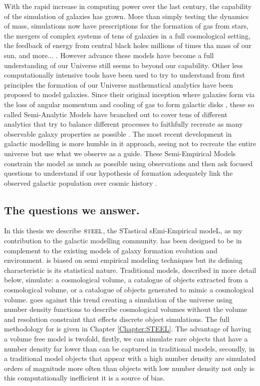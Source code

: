 With the rapid increase in computing power over the last century, the capability of the simulation of galaxies has grown. More than simply testing the dynamics of mass, simulations now have prescriptions for the formation of gas from stars, the mergers of complex systems of tens of galaxies in a full cosmological setting, the feedback of energy from central black holes millions of times tha mass of our sun, and more... \citep[e.g.,][]{McAlpine2015TheCatalogues, Pillepich2018FirstGalaxies}. However advance these models have become a full understanding of our Universe still seems to beyond our capability. Other less computationally intensive tools have been used to try to understand from first principles the formation of our Universe mathematical analytics have been proposed to model galaxies. Since their original inception where galaxies form via the loss of angular momentum and cooling of gas to form galactic disks \cite{Mo1998TheDiscs}, these so called Semi-Analytic Models have branched out to cover tens of different analytics that try to balance different processes to faithfully recreate as many observable galaxy properties as possible \citep[e.g.,][]{DeLucia2006TheGalaxies, Guo2011FromCosmology}. The most recent development in galactic modelling is more humble in it approach, seeing not to recreate the entire universe but use what we observe as a guide. These Semi-Empirical Models constrain the model as much as possible using observations and then ask focused questions to understand if our hypothesis of formation adequately link the observed galactic population over cosmic history \citep{Hopkins2010MERGERSMATTER, Zavala2012, Moster2013, Shankar2014, Moster2018Emerge10}.

\subsection{The questions we answer.}
In this thesis we describe $\textsc{steel}$, the STastical sEmi-Empirical modeL, as my contribution to the galactic modelling community. \steel has been designed to be in complement to the existing models of galaxy formation evolution and environment. \steel is biased on semi empirical modeling techniques but its defining characteristic is its statistical nature. Traditional models, described in more detail below, simulate: a cosmological volume, a catalogue of objects extracted from a cosmological volume, or a catalogue of objects generated to mimic a cosmological volume. \steel goes against this trend creating a simulation of the universe using number density functions to describe cosmological volumes without the volume and resolution constraint that effects discrete object simulations. The full methodology for \steel is given in Chapter \ref{Chapter:STEEL}. The advantage of having a volume free model is twofold, firstly, we can simulate rare objects that have a number density far lower than can be captured in traditional models, secondly, in a traditional model objects that appear with a high number density are simulated orders of magnitude more often than objects with low number density not only is this computationally inefficient it is a source of bias. 

